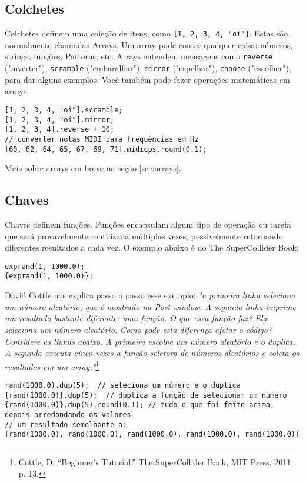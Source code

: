 \subsection{Colchetes}

Colchetes definem uma coleção de itens, como \texttt{[1, 2, 3, 4, "oi"]}. Estas são normalmente chamadas Arrays. Um array pode conter qualquer coisa: números, strings, funções, Patterns, etc. Arrays entendem mensagens como \texttt{reverse} ("inverter"), \texttt{scramble} ("embaralhar"), \texttt{mirror} ("espelhar"), \texttt{choose} ("escolher"), para dar alguns exemplos. Você também pode fazer operações matemáticas em arrays.


\begin{lstlisting}[style=SuperCollider-IDE, basicstyle=\scttfamily\footnotesize]
[1, 2, 3, 4, "oi"].scramble;
[1, 2, 3, 4, "oi"].mirror;
[1, 2, 3, 4].reverse + 10;
// converter notas MIDI para frequências em Hz 
[60, 62, 64, 65, 67, 69, 71].midicps.round(0.1);
\end{lstlisting}

Mais sobre arrays em breve na seção \ref{sec:arrays}.

\subsection{Chaves}

Chaves definem funções. Funções encapsulam algum tipo de operação ou tarefa que será provavelmente reutilizada múltiplas vezes, possivelmente retornando diferentes resultados a cada vez. O exemplo abaixo é do The SuperCollider Book:

\begin{lstlisting}[style=SuperCollider-IDE, basicstyle=\scttfamily\footnotesize]
exprand(1, 1000.0);
{exprand(1, 1000.0)};
\end{lstlisting}

David Cottle nos explica passo a passo esse exemplo: \textit{"a primeira linha seleciona um número aleatório, que é mostrado na Post window. A segunda linha imprime um resultado bastante diferente: uma função. O que essa função faz? Ela seleciona um número aleatório. Como pode esta diferença afetar o código? Considere as linhas abaixo. A primeira escolhe um número aleatório e o duplica. A segunda executa  cinco vezes a função-seletora-de-números-aleatórios e coleta os resultados em um array."}\footnote{Cottle, D. ``Beginner's Tutorial.'' The SuperCollider Book, MIT Press, 2011, p. 13.}

\begin{lstlisting}[style=SuperCollider-IDE, basicstyle=\scttfamily\footnotesize]
rand(1000.0).dup(5);  // seleciona um número e o duplica
{rand(1000.0)}.dup(5);  // duplica a função de selecionar um número 
{rand(1000.0)}.dup(5).round(0.1); // tudo o que foi feito acima, depois arredondando os valores
// um resultado semelhante a:
[rand(1000.0), rand(1000.0), rand(1000.0), rand(1000.0), rand(1000.0)]
\end{lstlisting}
 

